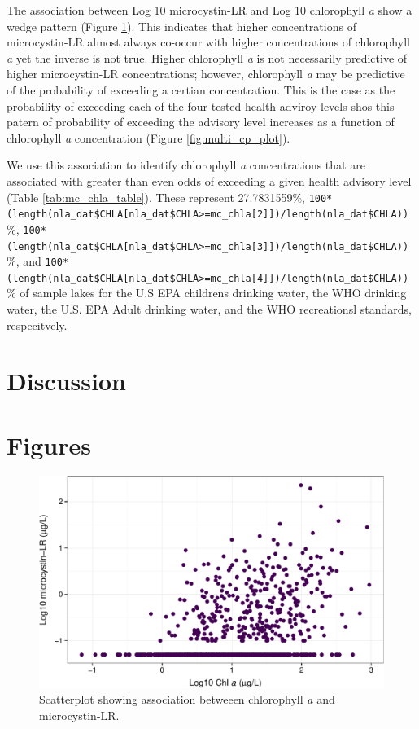 \documentclass[11pt,]{article}
\begin{document}
The association between Log 10 microcystin-LR and Log 10 chlorophyll
\emph{a} show a wedge pattern (Figure \ref{fig:chla_micro_scatter}).
This indicates that higher concentrations of microcystin-LR almost
always co-occur with higher concentrations of chlorophyll \emph{a} yet
the inverse is not true. Higher chlorophyll \emph{a} is not necessarily
predictive of higher microcystin-LR concentrations; however, chlorophyll
\emph{a} may be predictive of the probability of exceeding a certian
concentration. This is the case as the probability of exceeding each of
the four tested health adviroy levels shos this patern of probability of
exceeding the advisory level increases as a function of chlorophyll
\emph{a} concentration (Figure \ref{fig:multi_cp_plot}).

We use this association to identify chlorophyll \emph{a} concentrations
that are associated with greater than even odds of exceeding a given
health advisory level (Table \ref{tab:mc_chla_table}). These represent
27.7831559\%,
\texttt{100*(length(nla\_dat\$CHLA{[}nla\_dat\$CHLA\textgreater{}=mc\_chla{[}2{]}{]})/length(nla\_dat\$CHLA))}\%,
\texttt{100*(length(nla\_dat\$CHLA{[}nla\_dat\$CHLA\textgreater{}=mc\_chla{[}3{]}{]})/length(nla\_dat\$CHLA))}\%,
and
\texttt{100*(length(nla\_dat\$CHLA{[}nla\_dat\$CHLA\textgreater{}=mc\_chla{[}4{]}{]})/length(nla\_dat\$CHLA))}\%
of sample lakes for the U.S EPA childrens drinking water, the WHO
drinking water, the U.S. EPA Adult drinking water, and the WHO
recreationsl standards, respecitvely.

\section{Discussion}\label{discussion}

\section{Figures}\label{figures}

\begin{figure}[htbp]
\centering
\includegraphics{manuscript_files/figure-latex/chla_micro_scatter-1.pdf}
\caption{Scatterplot showing association betweeen chlorophyll \textit{a}
and microcystin-LR. \label{fig:chla_micro_scatter}}
\end{figure}
\end{document}

